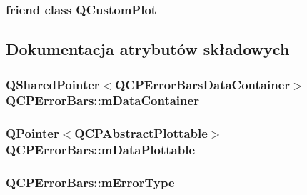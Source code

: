 \subsubsection[{\texorpdfstring{Q\+Custom\+Plot}{QCustomPlot}}]{\setlength{\rightskip}{0pt plus 5cm}friend class {\bf Q\+Custom\+Plot}\hspace{0.3cm}{\ttfamily [friend]}}\hypertarget{class_q_c_p_error_bars_a1cdf9df76adcfae45261690aa0ca2198}{}\label{class_q_c_p_error_bars_a1cdf9df76adcfae45261690aa0ca2198}


\subsection{Dokumentacja atrybutów składowych}
\subsubsection[{\texorpdfstring{m\+Data\+Container}{mDataContainer}}]{\setlength{\rightskip}{0pt plus 5cm}Q\+Shared\+Pointer$<${\bf Q\+C\+P\+Error\+Bars\+Data\+Container}$>$ Q\+C\+P\+Error\+Bars\+::m\+Data\+Container\hspace{0.3cm}{\ttfamily [protected]}}\hypertarget{class_q_c_p_error_bars_a83c7f452d0eebd302a7e4fb3a1957634}{}\label{class_q_c_p_error_bars_a83c7f452d0eebd302a7e4fb3a1957634}
\subsubsection[{\texorpdfstring{m\+Data\+Plottable}{mDataPlottable}}]{\setlength{\rightskip}{0pt plus 5cm}Q\+Pointer$<${\bf Q\+C\+P\+Abstract\+Plottable}$>$ Q\+C\+P\+Error\+Bars\+::m\+Data\+Plottable\hspace{0.3cm}{\ttfamily [protected]}}\hypertarget{class_q_c_p_error_bars_a14b6a5b49295990da84a05a3a89026bb}{}\label{class_q_c_p_error_bars_a14b6a5b49295990da84a05a3a89026bb}
\subsubsection[{\texorpdfstring{m\+Error\+Type}{mErrorType}}]{ Q\+C\+P\+Error\+Bars\+::m\+Error\+Type\hspace{0.3cm}{\ttfamily [protected]}}\hypertarget{class_q_c_p_error_bars_af9fd3117b86aac728c9e8e87c406ed9a}{}\label{class_q_c_p_error_bars_af9fd3117b86aac728c9e8e87c406ed9a}
